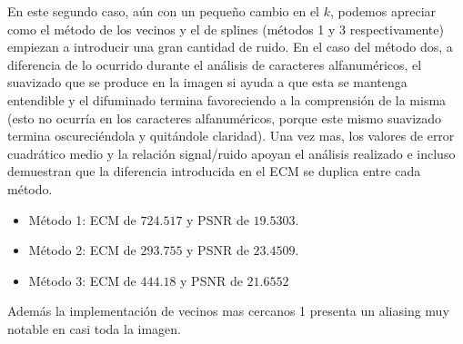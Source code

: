 En este segundo caso, aún con un pequeño cambio en el $k$, podemos apreciar como el método de los vecinos y el de splines (métodos 1 y 3 respectivamente) empiezan a introducir una gran cantidad de ruido. En el caso del método dos, a diferencia de lo ocurrido durante el análisis de caracteres alfanuméricos, el suavizado que se produce en la imagen si ayuda a que esta se mantenga entendible y el difuminado termina favoreciendo a la comprensión de la misma (esto no ocurría en los caracteres alfanuméricos, porque este mismo suavizado termina oscureciéndola y quitándole claridad).
Una vez mas, los valores de error cuadrático medio y la relación signal/ruido apoyan el análisis realizado e incluso demuestran que la diferencia introducida en el ECM se duplica entre cada método.

\begin{itemize}
 \item Método 1: ECM de $724.517$ y PSNR de $19.5303$.
 \item Método 2: ECM de $293.755$ y PSNR de $23.4509$.
 \item Método 3: ECM de $444.18$ y PSNR de $21.6552$
\end{itemize}

Además la implementación de vecinos mas cercanos 1 presenta un aliasing muy notable en casi toda la imagen.

